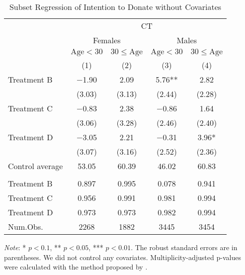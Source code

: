 \documentclass[12pt, a4paper]{article}
\begin{document}
\begin{table}[H]

\caption{\label{tab:int-lm-subset1}Subset Regression of Intention to Donate without Covariates}
\centering
\fontsize{8}{10}\selectfont
\begin{threeparttable}
\begin{tabular}[t]{lcccc}
\toprule
\multicolumn{1}{c}{ } & \multicolumn{4}{c}{CT} \\
\cmidrule(l{3pt}r{3pt}){2-5}
\multicolumn{1}{c}{ } & \multicolumn{2}{c}{Females} & \multicolumn{2}{c}{Males} \\
\cmidrule(l{3pt}r{3pt}){2-3} \cmidrule(l{3pt}r{3pt}){4-5}
\multicolumn{1}{c}{ } & \multicolumn{1}{c}{$\text{Age} < 30$} & \multicolumn{1}{c}{$30 \le \text{Age}$} & \multicolumn{1}{c}{$\text{Age} < 30$} & \multicolumn{1}{c}{$30 \le \text{Age}$} \\
\cmidrule(l{3pt}r{3pt}){2-2} \cmidrule(l{3pt}r{3pt}){3-3} \cmidrule(l{3pt}r{3pt}){4-4} \cmidrule(l{3pt}r{3pt}){5-5}
  & (1) & (2) & (3) & (4)\\
\midrule
Treatment B & \num{-1.90} & \num{2.09} & \num{5.76}** & \num{2.82}\\
 & (\num{3.03}) & (\num{3.13}) & (\num{2.44}) & (\num{2.28})\\
Treatment C & \num{-0.83} & \num{2.38} & \num{-0.86} & \num{1.64}\\
 & (\num{3.06}) & (\num{3.28}) & (\num{2.46}) & (\num{2.40})\\
Treatment D & \num{-3.05} & \num{2.21} & \num{-0.31} & \num{3.96}*\\
 & (\num{3.07}) & (\num{3.16}) & (\num{2.52}) & (\num{2.36})\\
\midrule
Control average & 53.05 & 60.39 & 46.02 & 60.83\\
\addlinespace[0.3em]
\multicolumn{5}{l}{\textit{Multiplicity-adjusted p-values}}\\
\hspace{1em}Treatment B & 0.897 & 0.995 & 0.078 & 0.941\\
\hspace{1em}Treatment C & 0.956 & 0.991 & 0.981 & 0.994\\
\hspace{1em}Treatment D & 0.973 & 0.973 & 0.982 & 0.994\\
Num.Obs. & \num{2268} & \num{1882} & \num{3445} & \num{3454}\\
\bottomrule
\end{tabular}
\begin{tablenotes}
\item \emph{Note}: * $p < 0.1$, ** $p < 0.05$, *** $p < 0.01$. The robust standard errors are in parentheses. We did not control any covariates. Multiplicity-adjusted p-values were calculated with the method proposed by \cite{List2019}.
\end{tablenotes}
\end{threeparttable}
\end{table}
\end{document}
